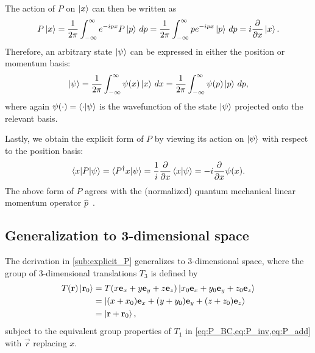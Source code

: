     The action of $P$ on $\ket{x}$ can then be written as
    \begin{align*}
        P\ket{x} = \frac{1}{2\pi}\int_{-\infty}^{\infty} e^{-ipx}P\ket{p} \,dp = \frac{1}{2\pi}\int_{-\infty}^{\infty} p e^{-ipx}\ket{p} \,dp = i\frac{\partial}{\partial x}\ket{x}.
    \end{align*}
    Therefore, an arbitrary state $\ket{\psi}$ can be expressed in either the position or momentum basis:
    \begin{align*}
        \ket{\psi} = \frac{1}{2\pi}\int_{-\infty}^{\infty} \psi(x)\ket{x} \,dx = \frac{1}{2\pi}\int_{-\infty}^{\infty} \psi(p)\ket{p} \,dp,
    \end{align*}
    where again $\psi(\cdot) = \braket{\cdot|\psi}$ is the wavefunction of the state $\ket{\psi}$ projected onto the relevant basis.

    Lastly, we obtain the explicit form of $P$ by viewing its action on $\ket{\psi}$ with respect to the position basis:
    \begin{align*}
        \braket{x|P|\psi} = \braket{P^\dagger x|\psi} = \frac{1}{i}\frac{\partial}{\partial x}\braket{x|\psi} = -i\frac{\partial}{\partial x}\psi(x).
    \end{align*}
    The above form of $P$ agrees with the (normalized) quantum mechanical linear momentum operator $\hat{p}$~\cite{Hall2013}.
    
    \subsection{Generalization to 3-dimensional space}
    The derivation in \cref{sub:explicit_P} generalizes to 3-dimensional space, where the group of 3-dimensional translations $T_3$ is defined by
    \begin{align*}
        T(\mathbf{r})\ket{\mathbf{r}_0}
            &= T(x\mathbf{e}_x + y\mathbf{e}_y + z\mathbf{e}_z)\ket{x_0\mathbf{e}_x + y_0\mathbf{e}_y + z_0\mathbf{e}_z} \\
            &= \ket{(x + x_0)\mathbf{e}_x + (y + y_0)\mathbf{e}_y + (z + z_0)\mathbf{e}_z} \\
            &= \ket{\mathbf{r}+\mathbf{r}_0},
    \end{align*}
    subject to the equivalent group properties of $T_1$ in \cref{eq:P_BC,eq:P_inv,eq:P_add} with $\vec{r}$ replacing $x$.
    
